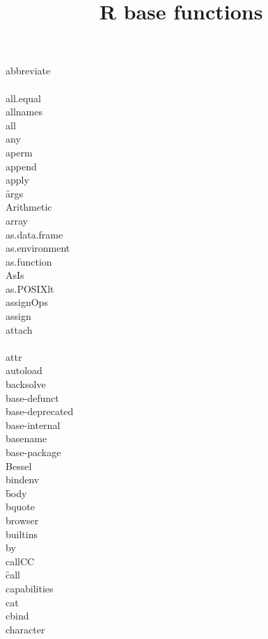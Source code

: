 \documentclass[12pt]{article}
\begin{document}
\title{R base functions}
\maketitle

\noindent
{abbreviate} \\
 \\
{all.equal} \\
{allnames} \\
{all} \\
{any} \\
{aperm} \\
{append} \\
{apply} \\
\f{args} \\
{Arithmetic} \\
{array} \\
{as.data.frame} \\
{as.environment} \\
{as.function} \\
{AsIs} \\
{as.POSIXlt} \\
{assignOps} \\
{assign} \\
{attach} \\
 \\
{attr} \\
{autoload} \\
{backsolve} \\
{base-defunct} \\
{base-deprecated} \\
{base-internal} \\
{basename} \\
{base-package} \\
{Bessel} \\
{bindenv} \\
\f{body} \\
{bquote} \\
{browser} \\
{builtins} \\
{by} \\
{callCC} \\
\f{call} \\
{capabilities} \\
{cat} \\
{cbind} \\
{character} \\
 \\
 \\
\end{document}
